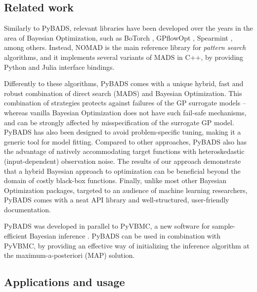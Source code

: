 \documentclass[
]{article}
\begin{document}
\hypertarget{related-work}{%
\subsection{Related work}\label{related-work}}

Similarly to PyBADS, relevant libraries have been developed over the years in the area of Bayesian Optimization, such as BoTorch \parencite{balandat2020botorch},  GPflowOpt \parencite{GPflowOpt2017}, Spearmint \parencite{pmlr-v32-snoek14}, among others. Instead, NOMAD \parencite{nomad4paper} is the main reference library for \textit{pattern search} algorithms, and it implements several variants of MADS in C++, by providing Python and Julia interface bindings.

Differently to these algorithms, PyBADS comes with a unique hybrid, fast and robust combination of direct search (MADS) and Bayesian Optimization. This combination of strategies protects against failures of the GP surrogate models – whereas vanilla Bayesian Optimization does not have such fail-safe mechanisms, and can be strongly affected by misspecification of the surrogate GP model. PyBADS has also been designed to avoid problem-specific tuning, making it a generic tool for model fitting. Compared to other approaches, PyBADS also has the advantage of natively accommodating  target functions with heteroskedastic (input-dependent) observation noise. The results of our approach demonstrate that a hybrid Bayesian approach to optimization can be beneficial beyond the domain of costly black-box functions.
Finally, unlike most other Bayesian Optimization packages, targeted to an audience of machine learning researchers, PyBADS comes with a neat API library and well-structured, user-friendly documentation.

PyBADS was developed in parallel to PyVBMC, a new software for sample-efficient Bayesian inference \parencite{huggins2023pyvbmc, acerbi2018variational, acerbi2020variational, acerbi2019exploration}. PyBADS can be used in combination with PyVBMC, by providing an effective way of initializing the inference algorithm at the maximum-a-posteriori (MAP) solution.

\hypertarget{applications-and-usage}{%
\subsection{Applications and usage}\label{applications-and-usage}}
\end{document}
